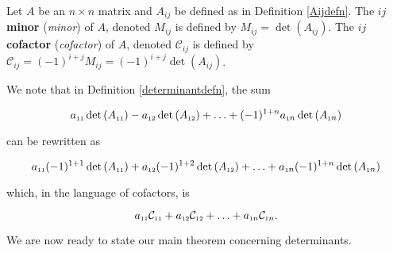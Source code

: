 \smallskip

\begin{definition}  \label{minorcofactordefn} Let $A$ be an $n \times n$ matrix and $A_{ij}$ be defined as in Definition \ref{Aijdefn}.  The \textbf{\boldmath $ij$ minor} (\textit{minor}) of $A$, denoted $M_{ij}$ is defined by $M_{ij} = \det\left(A_{ij}\right)$. The \textbf{\boldmath $ij$ cofactor} (\textit{cofactor}) of $A$, denoted $\mathcal{C}_{ij}$ is defined by $\mathcal{C}_{ij} = (-1)^{i+j}M_{ij} = (-1)^{i+j}\det\left(A_{ij}\right)$. 
\end{definition}

\smallskip

We note that in Definition \ref{determinantdefn}, the sum 

\[a_{\mbox{\tiny$11$}} \det\left(A_{\mbox{\tiny$11$}}\right)- a_{\mbox{\tiny$12$}} \det\left(A_{\mbox{\tiny$12$}}\right) +  \ldots  + (-1)^{1+n} a_{\mbox{\tiny$1$}n} \det\left(A_{\mbox{\tiny$1$}n}\right)\]

can be rewritten as

\[a_{\mbox{\tiny$11$}} (-1)^{1+1} \det\left(A_{\mbox{\tiny$11$}}\right) + a_{\mbox{\tiny$12$}} (-1)^{1+2} \det\left(A_{\mbox{\tiny$12$}}\right) + \ldots  + a_{\mbox{\tiny$1$}n} (-1)^{1+n} \det\left(A_{\mbox{\tiny$1$}n}\right)\]

which, in the language of cofactors, is

\[a_{\mbox{\tiny$11$}} \mathcal{C}_{\mbox{\tiny$11$}} + a_{\mbox{\tiny$12$}}\mathcal{C}_{\mbox{\tiny$12$}} + \ldots  + a_{\mbox{\tiny$1$}n}\mathcal{C}_{\mbox{\tiny$1$}n}. \]

We are now ready to state our main theorem concerning determinants.

\smallskip

